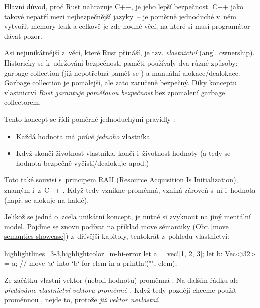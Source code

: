 \documentclass[main.tex]{subfiles}
\begin{document}

Hlavní důvod, proč Rust nahrazuje C++, je jeho lepší bezpečnost. C++ jako takové nepatří
mezi nejbezpečnější jazyky~-- je poměrně jednoduché v~něm vytvořit memory leak a celkově
je zde hodně věcí, na které si musí programátor dávat pozor.


Asi nejunikátnější z~věcí, které Rust přináší, je tzv. \emph{vlastnictví} (angl.
ownership). Historicky se k~udržování bezpečnosti paměti používaly dva různé způsoby:
garbage collection (již nepotřebná paměť se ) a manuální
alokace/dealokace. Garbage collection je pomalejší, ale zato zaručeně bezpečný. Díky
konceptu vlastnictví \emph{Rust garantuje paměťovou bezpečnost} bez zpomalení garbage
collectorem. \cite[kapitola\,4]{thebook}


Tento koncept se řídí poměrně jednoduchými pravidly \cite[sekce\,4.1]{thebook}:
\begin{itemize}
    \item Každá hodnota má \emph{právě jednoho} vlastníka
    \item Když skončí životnost vlastníka, končí i~životnost hodnoty (a tedy se hodnota
          bezpečně vyčistí/dealokuje apod.)
\end{itemize}

Toto také souvisí s~principem RAII (Resource Acquisition Is Initialization), znamým
i~z~C++ \cite[language/raii]{cppreference}. Když tedy vznikne proměnná, vzniká zároveň
s~ní i~hodnota (např. se alokuje na haldě).

Jelikož se jedná o~zcela unikátní koncept, je nutné si zvyknout na jiný mentální model.
Pojďme se znovu podívat na příklad move sémantiky (Obr.\,\ref{move semantics showcase})
z~dřívější kapitoly, tentokrát z~pohledu vlastnictví:

\obrazek
\begin{rustcode*}{highlightlines={3-3},highlightcolor=m-hi-error}
    let a = vec![1, 2, 3];
    let b: Vec<i32> = a; // move `a` into `b`
    for elem in a {
        println!("{}", elem);
    }
\end{rustcode*}

Ze začátku vlastní vektor (neboli hodnotu) proměnná . Na dalším řádku ale
\emph{předáváme vlastnictví vektoru proměnné }. Když tedy později chceme použít
proměnnou , nejde to, protože \emph{ již vektor nevlastní}.
\end{document}
